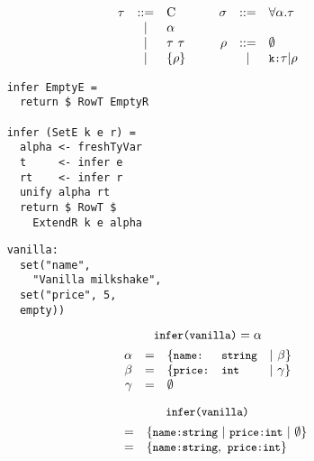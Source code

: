 \documentclass[20pt]{beamer}
\newcommand{\code}[1]{
    \texttt{\small{#1}}
}
\begin{document}
\begin{frame}
    \[
    \begin{array}{rclcrcl}
    \tau & ::= & \text{C}     & ~~ & \sigma & ::= & \forall \alpha. \tau  \\
         &  |  & \alpha       & ~~ &        &     &                       \\
         &  |  & \tau ~ \tau  & ~~ & \rho   & ::= & \emptyset             \\
         &  |  & \{ \rho \}   & ~~ &        &  |  & \code{k:}\tau | \rho  \\
    \end{array}
    \]
\end{frame}

\begin{frame}
    \begin{lstlisting}
    infer EmptyE =
      return $ RowT EmptyR

    infer (SetE k e r) =
      alpha <- freshTyVar
      t     <- infer e
      rt    <- infer r
      unify alpha rt
      return $ RowT $
        ExtendR k e alpha
    \end{lstlisting}
\end{frame}

\begin{frame}
    \begin{lstlisting}
    vanilla:
      set("name",
        "Vanilla milkshake",
      set("price", 5,
      empty))
    \end{lstlisting}
\end{frame}

\begin{frame}
    \[
    \code{infer(vanilla)} = \alpha
    \]
    \[
    \begin{array}{rclll}
    \alpha  & = & \{ \code{name:}  & \code{string} & | ~ \beta  \} \\
    \beta   & = & \{ \code{price:} & \code{int}    & | ~ \gamma \} \\
    \gamma  & = & \emptyset                                        \\
    \end{array}
    \]
\end{frame}

\begin{frame}
    \[
    \code{infer(vanilla)}
    \]
    \[
    \begin{array}{lll}
    ~ & = & \{ \code{name:} \code{string} ~ | ~
               \code{price:} \code{int} ~ | ~ \emptyset \} \\
    ~ & = & \{ \code{name:} \code{string}, ~ \code{price:} \code{int} \} \\
    \end{array}
    \]
\end{frame}
\end{document}
